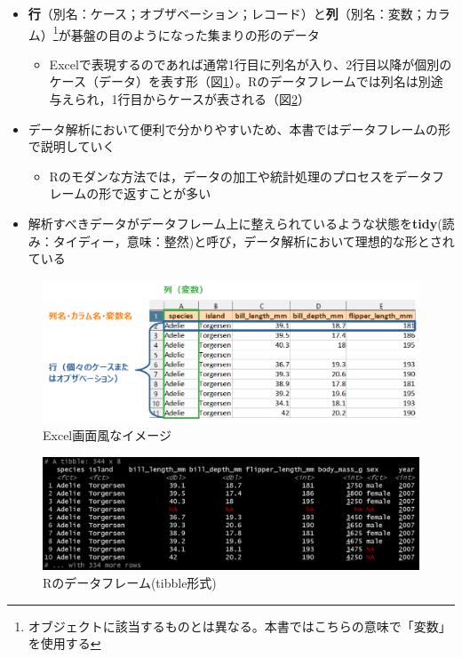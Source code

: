 \documentclass[
  xelatex,ja=standard, b5paper]{bxjsbook}
\providecommand{\tightlist}{%
  \setlength{\itemsep}{0pt}\setlength{\parskip}{0pt}}
\begin{document}
\begin{itemize}
\tightlist
\item
  \textbf{行}（別名：ケース；オブザベーション；レコード）と\textbf{列}（別名：変数；カラム）\footnote{オブジェクトに該当するものとは異なる。本書ではこちらの意味で「変数」を使用する}が碁盤の目のようになった集まりの形のデータ

  \begin{itemize}
  \tightlist
  \item
    Excelで表現するのであれば通常1行目に列名が入り、2行目以降が個別のケース（データ）を表す形（図\ref{fig:dfxl}）。Rのデータフレームでは列名は別途与えられ，1行目からケースが表される（図\ref{fig:dfr}）
  \end{itemize}
\item
  データ解析において便利で分かりやすいため、本書ではデータフレームの形で説明していく

  \begin{itemize}
  \tightlist
  \item
    Rのモダンな方法では，データの加工や統計処理のプロセスをデータフレームの形で返すことが多い
  \end{itemize}
\item
  解析すべきデータがデータフレーム上に整えられているような状態を\textbf{tidy}(読み：タイディー，意味：整然)と呼び，データ解析において理想的な形とされている
\end{itemize}

\begin{figure}

{\centering \includegraphics[width=0.8\linewidth]{images/df_xl} 

}

\caption{Excel画面風なイメージ}\label{fig:dfxl}
\end{figure}

\begin{figure}

{\centering \includegraphics[width=0.8\linewidth]{images/dfr} 

}

\caption{Rのデータフレーム(tibble形式)}\label{fig:dfr}
\end{figure}
\end{document}
